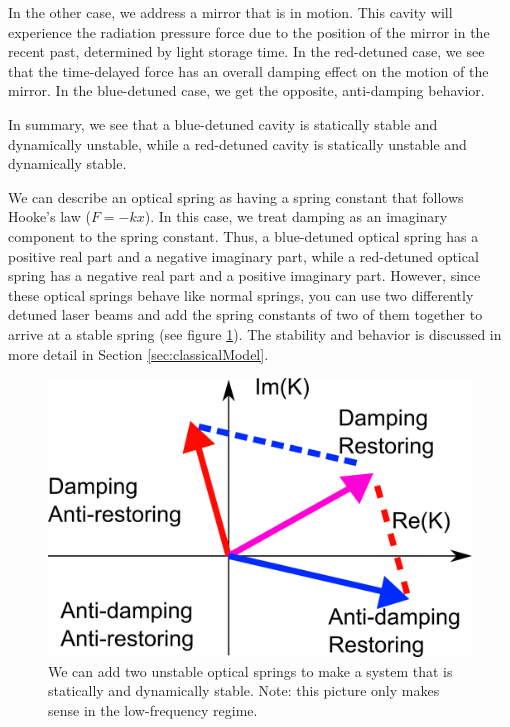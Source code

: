 In the other case, we address a mirror that is in motion. This cavity will experience the radiation pressure force due to the position of the mirror in the recent past, determined by light storage time. In the red-detuned case, we see that the time-delayed force has an overall damping effect on the motion of the mirror. In the blue-detuned case, we get the opposite, anti-damping behavior. 

In summary, we see that a blue-detuned cavity is statically stable and dynamically unstable, while a red-detuned cavity is statically unstable and dynamically stable.

We can describe an optical spring as having a spring constant that follows Hooke's law ($F=-kx$). 
In this case, we treat damping as an imaginary component to the spring constant. 
Thus, a blue-detuned optical spring has a positive real part and a negative imaginary part, while a red-detuned optical spring has a negative real part and a positive imaginary part.
However, since these optical springs behave like normal springs, you can use two differently detuned laser beams and add the spring constants of two of them together to arrive at a stable spring (see figure \ref{fig:opticalspringadd}). The stability and behavior is discussed in more detail in Section \ref{sec:classicalModel}.

\begin{figure}[hbtp]%
\center
\includegraphics[width=.5\textwidth]{figures/introduction/springadd}%
\caption[Adding Optical Springs]{We can add two unstable optical springs to make a system that is statically and dynamically stable. Note: this picture only makes sense in the low-frequency regime.}%
\label{fig:opticalspringadd}%
\end{figure}

